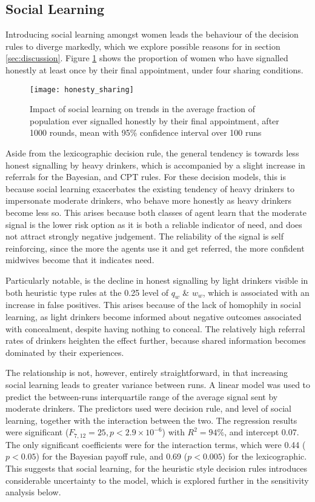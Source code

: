 \subsection{Social Learning}
\label{sub:sharing_results}

Introducing social learning amongst women leads the behaviour of the decision rules to diverge markedly, which we explore possible reasons for in section \ref{sec:discussion}. Figure \ref{fig:honest_sharing} shows the proportion of women who have signalled honestly at least once by their final appointment, under four sharing conditions. 

\begin{figure}[H]
\texttt{[image: honesty\_sharing]}
\caption{Impact of social learning on trends in the average fraction of population ever signalled honestly by their final appointment, after 1000 rounds, mean with 95\% confidence interval over 100 runs}
\label{fig:honest_sharing}
\end{figure}

Aside from the lexicographic decision rule, the general tendency is towards less honest signalling by heavy drinkers, which is accompanied by a slight increase in referrals for the Bayesian, and \ac{CPT} rules. For these decision models, this is because social learning exacerbates the existing tendency of heavy drinkers to impersonate moderate drinkers, who behave more honestly as heavy drinkers become less so. This arises because both classes of agent learn that the moderate signal is the lower risk option as it is both a reliable indicator of need, and does not attract strongly negative judgement. The reliability of the signal is self reinforcing, since the more the agents use it and get referred, the more confident midwives become that it indicates need.

Particularly notable, is the decline in honest signalling by light drinkers visible in both heuristic type rules at the 0.25 level of \(q_{w}\) \& \(w_{w}\), which is associated with an increase in false positives. This arises because of the lack of homophily in social learning, as light drinkers become informed about negative outcomes associated with concealment, despite having nothing to conceal. The relatively high referral rates of drinkers heighten the effect further, because shared information becomes dominated by their experiences. 

The relationship is not, however, entirely straightforward, in that increasing social learning leads to greater variance between runs. A linear model was used to predict the between-runs interquartile range of the average signal sent by moderate drinkers. The predictors used were decision rule, and level of social learning, together with the interaction between the two. The regression results were significant (\(F_{7,12}=25,p<2.9\times10^{-6}\)) with \(R^2=94\%\), and intercept 0.07. The only significant coefficients were for the interaction terms, which were 0.44 (\(p<0.05\)) for the Bayesian payoff rule, and 0.69 (\(p<0.005\)) for the lexicographic. This suggests that social learning, for the heuristic style decision rules introduces considerable uncertainty to the model, which is explored further in the sensitivity analysis below.


